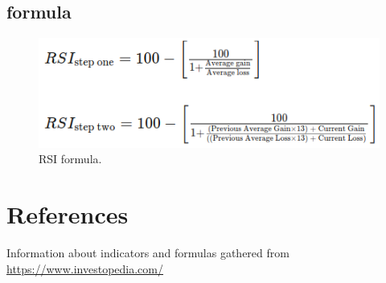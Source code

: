 \documentclass[12pt,a4paper]{article}
\begin{document}
\subsection{formula}

\begin{figure}[H]
    \includegraphics[scale=0.7]{../images/RSI.png}
    \caption{RSI formula.}
    \label{fig:RSI}
\end{figure}

\section{References}
Information about indicators and formulas gathered from \href{https://www.investopedia.com/}{https://www.investopedia.com/}
\end{document}
